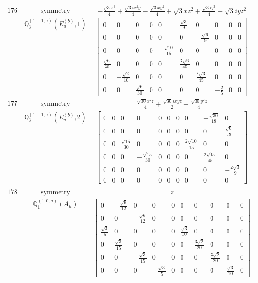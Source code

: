\documentclass[fleqn,8pt,landscape]{jsarticle}
\begin{document}
\begin{longtable}{ccc}
$ 176 $ & $ \text{symmetry} $ & $ - \frac{\sqrt{3} x^{3}}{4} + \frac{\sqrt{3} i x^{2} y}{4} - \frac{\sqrt{3} x y^{2}}{4} + \sqrt{3} x z^{2} + \frac{\sqrt{3} i y^{3}}{4} - \sqrt{3} i y z^{2} $ \\
$  $ & $ \mathbb{Q}_{3}^{(1,-1;a)}(E_{u}^{(b)},1) $ & $ \begin{bmatrix} 0 & 0 & 0 & 0 & 0 & \frac{\sqrt{3}}{9} & 0 & 0 & 0 & 0 \\ 0 & 0 & 0 & 0 & 0 & 0 & - \frac{\sqrt{6}}{9} & 0 & 0 & 0 \\ 0 & 0 & 0 & 0 & - \frac{\sqrt{10}}{15} & 0 & 0 & 0 & 0 & 0 \\ \frac{\sqrt{6}}{30} & 0 & 0 & 0 & 0 & \frac{7 \sqrt{6}}{45} & 0 & 0 & 0 & 0 \\ 0 & - \frac{\sqrt{2}}{10} & 0 & 0 & 0 & 0 & \frac{2 \sqrt{3}}{45} & 0 & 0 & 0 \\ 0 & 0 & \frac{\sqrt{6}}{30} & 0 & 0 & 0 & 0 & - \frac{2}{5} & 0 & 0 \end{bmatrix} $ \\ \hline
$ 177 $ & $ \text{symmetry} $ & $ \frac{\sqrt{30} x^{2} z}{4} + \frac{\sqrt{30} i x y z}{2} - \frac{\sqrt{30} y^{2} z}{4} $ \\
$  $ & $ \mathbb{Q}_{3}^{(1,-1;a)}(E_{u}^{(b)},2) $ & $ \begin{bmatrix} 0 & 0 & 0 & 0 & 0 & 0 & 0 & 0 & - \frac{\sqrt{30}}{18} & 0 \\ 0 & 0 & 0 & 0 & 0 & 0 & 0 & 0 & 0 & \frac{\sqrt{6}}{18} \\ 0 & 0 & \frac{\sqrt{15}}{30} & 0 & 0 & 0 & 0 & \frac{2 \sqrt{10}}{15} & 0 & 0 \\ 0 & 0 & 0 & - \frac{\sqrt{15}}{30} & 0 & 0 & 0 & 0 & \frac{2 \sqrt{15}}{45} & 0 \\ 0 & 0 & 0 & 0 & 0 & 0 & 0 & 0 & 0 & - \frac{2 \sqrt{3}}{9} \\ 0 & 0 & 0 & 0 & 0 & 0 & 0 & 0 & 0 & 0 \end{bmatrix} $ \\ \hline
$ 178 $ & $ \text{symmetry} $ & $ z $ \\
$  $ & $ \mathbb{Q}_{1}^{(1,0;a)}(A_{u}) $ & $ \begin{bmatrix} 0 & - \frac{\sqrt{6}}{12} & 0 & 0 & 0 & 0 & 0 & 0 & 0 & 0 \\ 0 & 0 & - \frac{\sqrt{6}}{12} & 0 & 0 & 0 & 0 & 0 & 0 & 0 \\ \frac{\sqrt{3}}{5} & 0 & 0 & 0 & 0 & \frac{\sqrt{3}}{10} & 0 & 0 & 0 & 0 \\ 0 & \frac{\sqrt{3}}{15} & 0 & 0 & 0 & 0 & \frac{3 \sqrt{2}}{20} & 0 & 0 & 0 \\ 0 & 0 & - \frac{\sqrt{3}}{15} & 0 & 0 & 0 & 0 & \frac{3 \sqrt{2}}{20} & 0 & 0 \\ 0 & 0 & 0 & - \frac{\sqrt{3}}{5} & 0 & 0 & 0 & 0 & \frac{\sqrt{3}}{10} & 0 \end{bmatrix} $ \\ \hline

\end{longtable}
\end{document}
